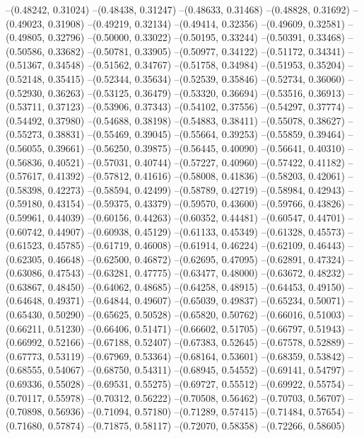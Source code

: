 --(0.48242, 0.31024)
--(0.48438, 0.31247)
--(0.48633, 0.31468)
--(0.48828, 0.31692)
--(0.49023, 0.31908)
--(0.49219, 0.32134)
--(0.49414, 0.32356)
--(0.49609, 0.32581)
--(0.49805, 0.32796)
--(0.50000, 0.33022)
--(0.50195, 0.33244)
--(0.50391, 0.33468)
--(0.50586, 0.33682)
--(0.50781, 0.33905)
--(0.50977, 0.34122)
--(0.51172, 0.34341)
--(0.51367, 0.34548)
--(0.51562, 0.34767)
--(0.51758, 0.34984)
--(0.51953, 0.35204)
--(0.52148, 0.35415)
--(0.52344, 0.35634)
--(0.52539, 0.35846)
--(0.52734, 0.36060)
--(0.52930, 0.36263)
--(0.53125, 0.36479)
--(0.53320, 0.36694)
--(0.53516, 0.36913)
--(0.53711, 0.37123)
--(0.53906, 0.37343)
--(0.54102, 0.37556)
--(0.54297, 0.37774)
--(0.54492, 0.37980)
--(0.54688, 0.38198)
--(0.54883, 0.38411)
--(0.55078, 0.38627)
--(0.55273, 0.38831)
--(0.55469, 0.39045)
--(0.55664, 0.39253)
--(0.55859, 0.39464)
--(0.56055, 0.39661)
--(0.56250, 0.39875)
--(0.56445, 0.40090)
--(0.56641, 0.40310)
--(0.56836, 0.40521)
--(0.57031, 0.40744)
--(0.57227, 0.40960)
--(0.57422, 0.41182)
--(0.57617, 0.41392)
--(0.57812, 0.41616)
--(0.58008, 0.41836)
--(0.58203, 0.42061)
--(0.58398, 0.42273)
--(0.58594, 0.42499)
--(0.58789, 0.42719)
--(0.58984, 0.42943)
--(0.59180, 0.43154)
--(0.59375, 0.43379)
--(0.59570, 0.43600)
--(0.59766, 0.43826)
--(0.59961, 0.44039)
--(0.60156, 0.44263)
--(0.60352, 0.44481)
--(0.60547, 0.44701)
--(0.60742, 0.44907)
--(0.60938, 0.45129)
--(0.61133, 0.45349)
--(0.61328, 0.45573)
--(0.61523, 0.45785)
--(0.61719, 0.46008)
--(0.61914, 0.46224)
--(0.62109, 0.46443)
--(0.62305, 0.46648)
--(0.62500, 0.46872)
--(0.62695, 0.47095)
--(0.62891, 0.47324)
--(0.63086, 0.47543)
--(0.63281, 0.47775)
--(0.63477, 0.48000)
--(0.63672, 0.48232)
--(0.63867, 0.48450)
--(0.64062, 0.48685)
--(0.64258, 0.48915)
--(0.64453, 0.49150)
--(0.64648, 0.49371)
--(0.64844, 0.49607)
--(0.65039, 0.49837)
--(0.65234, 0.50071)
--(0.65430, 0.50290)
--(0.65625, 0.50528)
--(0.65820, 0.50762)
--(0.66016, 0.51003)
--(0.66211, 0.51230)
--(0.66406, 0.51471)
--(0.66602, 0.51705)
--(0.66797, 0.51943)
--(0.66992, 0.52166)
--(0.67188, 0.52407)
--(0.67383, 0.52645)
--(0.67578, 0.52889)
--(0.67773, 0.53119)
--(0.67969, 0.53364)
--(0.68164, 0.53601)
--(0.68359, 0.53842)
--(0.68555, 0.54067)
--(0.68750, 0.54311)
--(0.68945, 0.54552)
--(0.69141, 0.54797)
--(0.69336, 0.55028)
--(0.69531, 0.55275)
--(0.69727, 0.55512)
--(0.69922, 0.55754)
--(0.70117, 0.55978)
--(0.70312, 0.56222)
--(0.70508, 0.56462)
--(0.70703, 0.56707)
--(0.70898, 0.56936)
--(0.71094, 0.57180)
--(0.71289, 0.57415)
--(0.71484, 0.57654)
--(0.71680, 0.57874)
--(0.71875, 0.58117)
--(0.72070, 0.58358)
--(0.72266, 0.58605)
